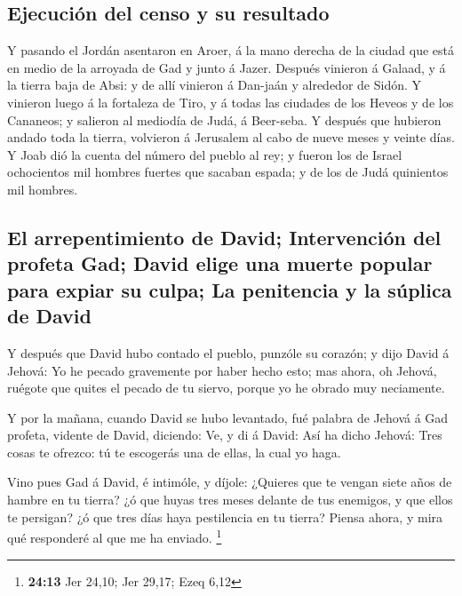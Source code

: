 \hypertarget{ejecuciuxf3n-del-censo-y-su-resultado}{%
\subsection{Ejecución del censo y su
resultado}\label{ejecuciuxf3n-del-censo-y-su-resultado}}

 Y pasando el Jordán asentaron en Aroer, á la mano derecha
de la ciudad que está en medio de la arroyada de Gad y junto á Jazer.
 Después vinieron á Galaad, y á la tierra baja de Absi: y
de allí vinieron á Dan-jaán y alrededor de Sidón.  Y
vinieron luego á la fortaleza de Tiro, y á todas las ciudades de los
Heveos y de los Cananeos; y salieron al mediodía de Judá, á Beer-seba.
 Y después que hubieron andado toda la tierra, volvieron á
Jerusalem al cabo de nueve meses y veinte días.  Y Joab
dió la cuenta del número del pueblo al rey; y fueron los de Israel
ochocientos mil hombres fuertes que sacaban espada; y de los de Judá
quinientos mil hombres.

\hypertarget{el-arrepentimiento-de-david-intervenciuxf3n-del-profeta-gad-david-elige-una-muerte-popular-para-expiar-su-culpa-la-penitencia-y-la-suxfaplica-de-david}{%
\subsection{El arrepentimiento de David; Intervención del profeta Gad;
David elige una muerte popular para expiar su culpa; La penitencia y la
súplica de
David}\label{el-arrepentimiento-de-david-intervenciuxf3n-del-profeta-gad-david-elige-una-muerte-popular-para-expiar-su-culpa-la-penitencia-y-la-suxfaplica-de-david}}

 Y después que David hubo contado el pueblo, punzóle su
corazón; y dijo David á Jehová: Yo he pecado gravemente por haber hecho
esto; mas ahora, oh Jehová, ruégote que quites el pecado de tu siervo,
porque yo he obrado muy neciamente.

 Y por la mañana, cuando David se hubo levantado, fué
palabra de Jehová á Gad profeta, vidente de David, diciendo:
 Ve, y di á David: Así ha dicho Jehová: Tres cosas te
ofrezco: tú te escogerás una de ellas, la cual yo haga.

 Vino pues Gad á David, é intimóle, y díjole: ¿Quieres
que te vengan siete años de hambre en tu tierra? ¿ó que huyas tres meses
delante de tus enemigos, y que ellos te persigan? ¿ó que tres días haya
pestilencia en tu tierra? Piensa ahora, y mira qué responderé al que me
ha enviado. \footnote{\textbf{24:13} Jer 24,10; Jer 29,17; Ezeq 6,12}


